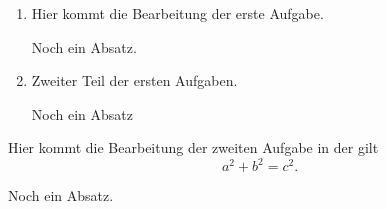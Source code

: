 \documentclass[sheet=3, task=6, prefix]{exercise}
\begin{document}
    \begin{enumerate}
      \item Hier kommt die Bearbeitung der erste Aufgabe.
      
        Noch ein Absatz.
        
      \item Zweiter Teil der ersten Aufgaben.
      
        Noch ein Absatz
    \end{enumerate}
  
    Hier kommt die Bearbeitung der zweiten Aufgabe in der gilt
    \[ a^2+b^2=c^2. \]
    
    Noch ein Absatz.
\end{document}
